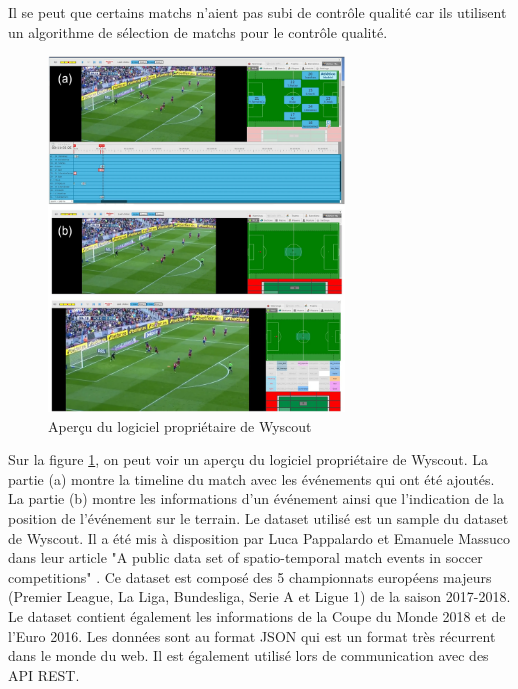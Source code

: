\documentclass[12pt]{article}
\begin{document}
\newline
Il se peut que certains matchs n'aient pas subi de contrôle qualité car ils utilisent un algorithme de sélection de matchs pour le contrôle qualité.
\begin{figure}[htp]
    \centering
    \includegraphics[width=0.7\textwidth]{img/logiciel_proprietaire.png}
    \caption{Aperçu du logiciel propriétaire de Wyscout}
    \label{fig:logiciel_proprietaire}
\end{figure}
Sur la figure \ref{fig:logiciel_proprietaire}, on peut voir un aperçu du logiciel propriétaire de Wyscout.
La partie (a) montre la timeline du match avec les événements qui ont été ajoutés.
La partie (b) montre les informations d'un événement ainsi que l'indication de la position de l'événement sur le terrain.
\newline\newline
Le dataset utilisé est un sample du dataset de Wyscout. 
Il a été mis à disposition par Luca Pappalardo et Emanuele Massuco dans leur article "A public data set of spatio-temporal match events in soccer competitions" \cite{pappalardoPublicDataSet2019}.
Ce dataset est composé des 5 championnats européens majeurs (Premier League, La Liga, Bundesliga, Serie A et Ligue 1) de la saison 2017-2018. 
Le dataset contient également les informations de la Coupe du Monde 2018 et de l'Euro 2016.
Les données sont au format JSON qui est un format très récurrent dans le monde du web. Il est également utilisé lors de communication avec des API REST.
\end{document}
